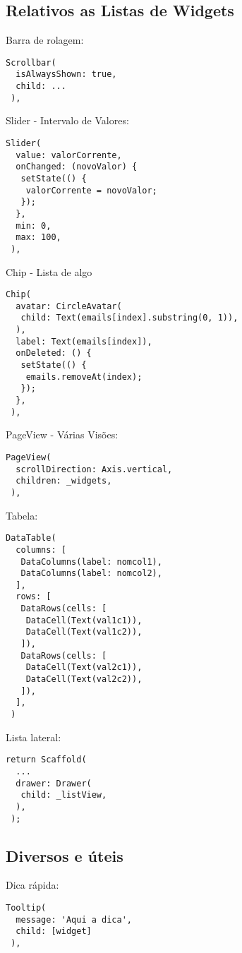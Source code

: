 \documentclass[11pt]{scrartcl}
\begin{document}
\subsection{Relativos as Listas de Widgets}
Barra de rolagem:
\begin{lstlisting}[]
 Scrollbar(
  isAlwaysShown: true,
  child: ...
 ), 
\end{lstlisting}

Slider - Intervalo de Valores: 
\begin{lstlisting}[]
 Slider(
  value: valorCorrente,
  onChanged: (novoValor) {
   setState(() {
    valorCorrente = novoValor; 
   });
  },
  min: 0,
  max: 100,
 ),
\end{lstlisting}

Chip - Lista de algo
\begin{lstlisting}[]
 Chip(
  avatar: CircleAvatar(
   child: Text(emails[index].substring(0, 1)),
  ),
  label: Text(emails[index]),
  onDeleted: () {
   setState(() {
    emails.removeAt(index);
   });
  },
 ),	
\end{lstlisting}

PageView - Várias Visões:
\begin{lstlisting}[]
 PageView(
  scrollDirection: Axis.vertical,
  children: _widgets,
 ),	
\end{lstlisting}

Tabela:
\begin{lstlisting}[]
 DataTable(
  columns: [
   DataColumns(label: nomcol1),
   DataColumns(label: nomcol2),
  ],
  rows: [
   DataRows(cells: [
    DataCell(Text(val1c1)),
    DataCell(Text(val1c2)),
   ]),
   DataRows(cells: [
    DataCell(Text(val2c1)),
    DataCell(Text(val2c2)),
   ]),
  ],
 )
\end{lstlisting}

Lista lateral:
\begin{lstlisting}[]
 return Scaffold(
  ...
  drawer: Drawer(
   child: _listView,
  ),
 );
\end{lstlisting}

\subsection{Diversos e úteis}

Dica rápida:
\begin{lstlisting}[]
 Tooltip(
  message: 'Aqui a dica', 
  child: [widget]
 ),
\end{lstlisting}
\end{document}
